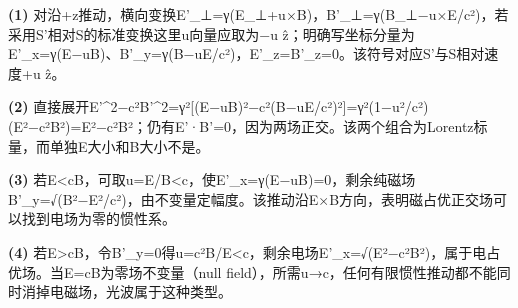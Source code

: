 \par\noindent\textbf{(1)} 对沿+z推动，横向变换E'\_⊥=γ(E\_⊥+u×B)，B'\_⊥=γ(B\_⊥−u×E/c²)，若采用S'相对S的标准变换这里u向量应取为−u ẑ；明确写坐标分量为E'\_x=γ(E−uB)、B'\_y=γ(B−uE/c²)，E'\_z=B'\_z=0。该符号对应S'与S相对速度+u ẑ。
\par\noindent\textbf{(2)} 直接展开E'\textasciicircum{}2−c²B'\textasciicircum{}2=γ²[(E−uB)²−c²(B−uE/c²)²]=γ²(1−u²/c²)(E²−c²B²)=E²−c²B²；仍有E'·B'=0，因为两场正交。该两个组合为Lorentz标量，而单独E大小和B大小不是。
\par\noindent\textbf{(3)} 若E<cB，可取u=E/B<c，使E'\_x=γ(E−uB)=0，剩余纯磁场B'\_y=√(B²−E²/c²)，由不变量定幅度。该推动沿E×B方向，表明磁占优正交场可以找到电场为零的惯性系。
\par\noindent\textbf{(4)} 若E>cB，令B'\_y=0得u=c²B/E<c，剩余电场E'\_x=√(E²−c²B²)，属于电占优场。当E=cB为零场不变量（null field），所需u→c，任何有限惯性推动都不能同时消掉电磁场，光波属于这种类型。
